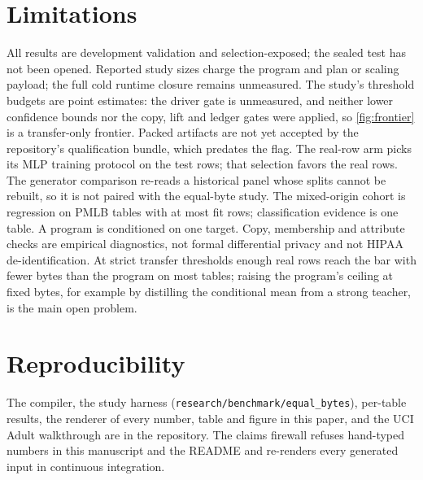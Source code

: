 \documentclass{article}
\theoremstyle{remark}
\begin{document}
\section{Limitations}
\label{sec:limits}

All results are development validation and selection-exposed; the sealed test has not been opened. Reported study sizes charge the program and plan or scaling payload; the full cold runtime closure remains unmeasured. The
study's threshold budgets are point estimates: the driver gate is unmeasured, and neither lower confidence
bounds nor the copy, lift and ledger gates were applied, so \cref{fig:frontier} is a transfer-only frontier.
Packed artifacts are not yet accepted by the repository's qualification bundle, which predates the flag.
The real-row arm picks its MLP training protocol on the test rows; that selection favors the real rows. The
generator comparison re-reads a historical panel whose splits cannot be rebuilt, so it is not paired with
the equal-byte study. The mixed-origin cohort is regression on PMLB tables with at most \cFitCap{} fit rows;
classification evidence is one table. A program is conditioned on one target. Copy, membership and
attribute checks are empirical diagnostics, not formal differential privacy and not HIPAA
de-identification. At strict transfer thresholds enough real rows reach the bar with fewer bytes than the
program on most tables; raising the program's ceiling at fixed bytes, for example by distilling the
conditional mean from a strong teacher, is the main open problem.

\section*{Reproducibility}
The compiler, the study harness (\texttt{research/benchmark/equal\_bytes}), per-table results, the renderer
of every number, table and figure in this paper, and the UCI Adult walkthrough are in the repository. The
claims firewall refuses hand-typed numbers in this manuscript and the README and re-renders every
generated input in continuous integration.



\end{document}
